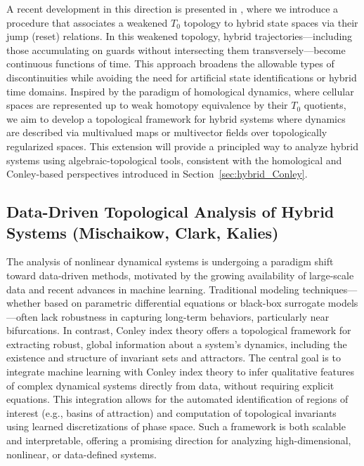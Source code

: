 \documentclass[letterpaper,11pt]{article}
\begin{document}
A recent development in this direction is presented in \cite{ClGu-weakened_topologies}, where we introduce a procedure that associates a weakened $T_0$ topology to hybrid state spaces via their jump (reset) relations.
In this weakened topology, hybrid trajectories—including those accumulating on guards without intersecting them transversely—become continuous functions of time.
This approach broadens the allowable types of discontinuities while avoiding the need for artificial state identifications or hybrid time domains.
Inspired by the paradigm of homological dynamics, where cellular spaces are represented up to weak homotopy equivalence by their $T_0$ quotients, we aim to develop a topological framework for hybrid systems where dynamics are described via multivalued maps or multivector fields over topologically regularized spaces.
This extension will provide a principled way to analyze hybrid systems using algebraic-topological tools, consistent with the homological and Conley-based perspectives introduced in Section~\ref{sec:hybrid_Conley}.


\subsection{Data-Driven Topological Analysis of Hybrid Systems (Mischaikow, Clark, Kalies)}\label{sec:learning_Mischaikow}

The analysis of nonlinear dynamical systems is undergoing a paradigm shift toward data-driven methods, motivated by the growing availability of large-scale data and recent advances in machine learning.
Traditional modeling techniques—whether based on parametric differential equations or black-box surrogate models—often lack robustness in capturing long-term behaviors, particularly near bifurcations.
In contrast, Conley index theory offers a topological framework for extracting robust, global information about a system’s dynamics, including the existence and structure of invariant sets and attractors.
The central goal is to integrate machine learning with Conley index theory to infer qualitative features of complex dynamical systems directly from data, without requiring explicit equations.
This integration allows for the automated identification of regions of interest (e.g., basins of attraction) and computation of topological invariants using learned discretizations of phase space.
Such a framework is both scalable and interpretable, offering a promising direction for analyzing high-dimensional, nonlinear, or data-defined systems.
\end{document}
